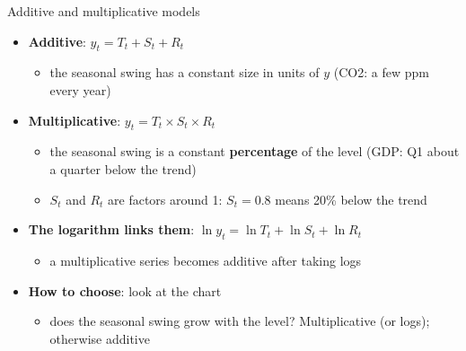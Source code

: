 \begin{frame}{Additive and multiplicative models}
\itemsize{\small}
\begin{itemize}
    \item \textbf{Additive}: $y_t = T_t + S_t + R_t$
    \begin{itemize}
        \item the seasonal swing has a constant size in units of $y$ (CO2: a few ppm every year)
    \end{itemize}
    \item \textbf{Multiplicative}: $y_t = T_t \times S_t \times R_t$
    \begin{itemize}
        \item the seasonal swing is a constant \textbf{percentage} of the level (GDP: Q1 about a quarter below the trend)
        \item $S_t$ and $R_t$ are factors around 1: $S_t = 0.8$ means 20\% below the trend
    \end{itemize}
    \item \textbf{The logarithm links them}: $\ln y_t = \ln T_t + \ln S_t + \ln R_t$
    \begin{itemize}
        \item a multiplicative series becomes additive after taking logs
    \end{itemize}
    \item \textbf{How to choose}: look at the chart
    \begin{itemize}
        \item does the seasonal swing grow with the level? Multiplicative (or logs); otherwise additive
    \end{itemize}
\end{itemize}
\end{frame}

